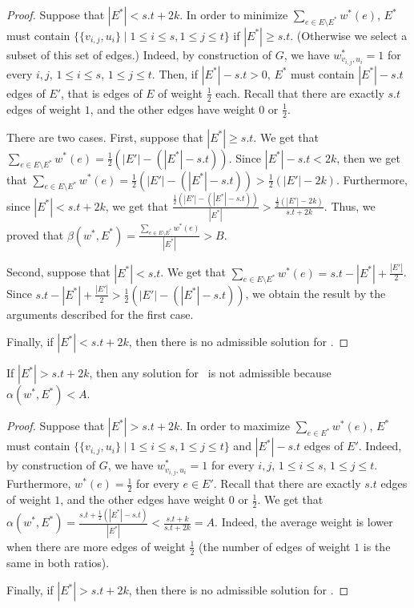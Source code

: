\begin{proof}
Suppose that $|E^*| < s.t+2k$.
In order to minimize $\sum_{e \in E \setminus E^*} w^*(e)$,
$E^*$ must contain $\{\{v_{i,j},u_{i}\} \mid 1 \leq i \leq s, 1 \leq
j \leq t\}$ if $|E^*| \geq s.t$.
(Otherwise we select a subset of this set of edges.)
Indeed, by construction of $G$, we have $w^{*}_{v_{i,j},u_{i}} = 1$
for every $i,j$, $1 \leq i \leq s$, $1 \leq j \leq t$.
Then, if $|E^*| - s.t > 0$, $E^*$ must contain $|E^*| - s.t$
edges of $E'$, that is edges of $E$ of weight $\frac{1}{2}$ each.
Recall that there are exactly $s.t$ edges of weight $1$, and the other
edges have weight $0$ or $\frac{1}{2}$.

There are two cases.
First, suppose that $|E^*| \geq s.t$.
We get that $\sum_{e \in E \setminus E^*} w^*(e) =
\frac{1}{2}(|E'| - (|E^*| - s.t))$.
Since $|E^*| - s.t < 2k$, then we get that $\sum_{e \in E \setminus E^*} w^*(e) =
\frac{1}{2}(|E'| - (|E^*| - s.t)) > \frac{1}{2}(|E'| - 2k)$.
Furthermore, since $|E^*| < s.t+2k$, we get that 
$\frac{\frac{1}{2}(|E'| - (|E^*| - s.t))}{|E^*|} >
\frac{\frac{1}{2}(|E'|-2k)}{s.t+2k}$.
Thus, we proved that $\beta(w^{*},E^*) = \frac{\sum_{e \in E \setminus E^*}
  w^*(e)}{|E^*|} > B$.

Second, suppose that $|E^*| < s.t$.
We get that $\sum_{e \in E \setminus E^*} w^*(e) = s.t - |E^*|
+ \frac{|E'|}{2}$.
Since $s.t - |E^*| + \frac{|E'|}{2} > \frac{1}{2}(|E'| - (|E^*| -
s.t))$, we obtain the result by the arguments described for the first
case.

Finally, if $|E^*| < s.t+2k$, then there is no admissible solution
for \PROBLEM.
\end{proof}

\begin{lemma}
\label{lem:alpha}
If $|E^*| > s.t+2k$, then any solution for \PROBLEM~is not
admissible because $\alpha(w^{*},E^*) < A$.
\end{lemma}

\begin{proof}
  Suppose that $|E^*| > s.t+2k$.
  In order to maximize $\sum_{e \in E^*} w^*(e)$,
$E^*$ must contain $\{\{v_{i,j},u_{i}\} \mid 1 \leq i \leq s, 1 \leq
  j \leq t\}$ and $|E^*| - s.t$ edges of $E'$.
Indeed, by construction of $G$, we have $w^{*}_{v_{i,j},u_{i}} = 1$
for every $i,j$, $1 \leq i \leq s$, $1 \leq j \leq t$.
Furthermore, $w^*(e) = \frac{1}{2}$ for every $e \in E'$.
Recall that there are exactly $s.t$ edges of weight $1$, and the other
edges have weight $0$ or $\frac{1}{2}$.
We get that $\alpha(w^{*},E^*) = \frac{s.t + \frac{1}{2}(|E^*| -
  s.t)}{|E^*|} < \frac{s.t+k}{s.t+2k} = A$.
Indeed, the average weight is lower when there are more edges of
weight $\frac{1}{2}$ (the number of edges of weight $1$ is the same in
both ratios).

Finally, if $|E^*| > s.t+2k$, then there is no admissible solution
for \PROBLEM.
\end{proof}

